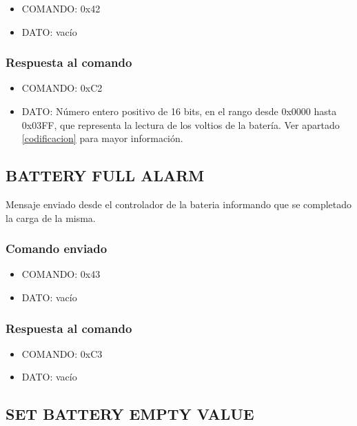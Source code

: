 \documentclass[a4paper,10pt]{article}
\begin{document}
\begin{itemize}
	\item{COMANDO:} 0x42
	\item{DATO:} vac\'io
\end{itemize}

\subsubsection*{Respuesta al comando}

\begin{itemize}
	\item{COMANDO:} 0xC2
	\item{DATO:} N\'umero entero positivo de 16 bits, en el rango desde 0x0000 hasta 0x03FF, que representa la lectura de los voltios de la bater\'ia.
		Ver apartado \ref{codificacion} para mayor informaci\'on.

\end{itemize}

\subsection{BATTERY FULL ALARM}
\label{battery_full_alarm}

Mensaje enviado desde el controlador de la bateria informando que se completado la carga de la misma.

\subsubsection*{Comando enviado}

\begin{itemize}
	\item{COMANDO:} 0x43
	\item{DATO:} vac\'io
\end{itemize}

\subsubsection*{Respuesta al comando}

\begin{itemize}
	\item{COMANDO:} 0xC3
	\item{DATO:} vac\'io
\end{itemize}

\subsection{SET BATTERY EMPTY VALUE}
\label{set_battery_empty_value}
\end{document}
